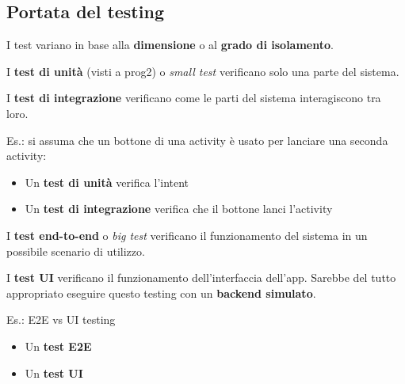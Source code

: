 \subsection{Portata del testing}
\par I test variano in base alla \textbf{dimensione} o al \textbf{grado di isolamento}.
\par I \textbf{test di unità} (visti a prog2) o \textit{small test} verificano solo una parte del sistema.
\par I \textbf{test di integrazione} verificano come le parti del sistema interagiscono tra loro.
\par Es.: si assuma che un bottone di una activity è usato per lanciare una seconda activity:
\begin{itemize}
    \item Un \textbf{test di unità} verifica l'intent
    \item Un \textbf{test di integrazione} verifica che il bottone lanci l'activity
\end{itemize}
\par I \textbf{test end-to-end} o \textit{big test} verificano il funzionamento del sistema in un possibile scenario di utilizzo.
\par I \textbf{test UI} verificano il funzionamento dell'interfaccia dell'app. Sarebbe del tutto appropriato eseguire questo testing con un \textbf{backend simulato}.
\par Es.: E2E vs UI testing
\begin{itemize}
    \item Un \textbf{test E2E} 
    \item Un \textbf{test UI} 
\end{itemize}

